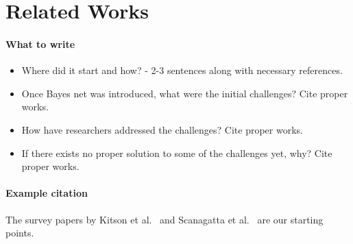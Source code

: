 \section{Related Works}
\paragraph*{What to write}
\begin{itemize}
    \item Where did it start and how? - 2-3 sentences along with necessary references.
    \item Once Bayes net was introduced, what were the initial challenges? Cite proper works.
    \item How have researchers addressed the challenges? Cite proper works.
    \item If there exists no proper solution to some of the challenges yet, why? Cite proper works.
\end{itemize}

\paragraph*{Example citation}
The survey papers by Kitson et al.~\cite{kitson2023survey} and Scanagatta et al.~\cite{scanagatta2019survey} are our starting points.